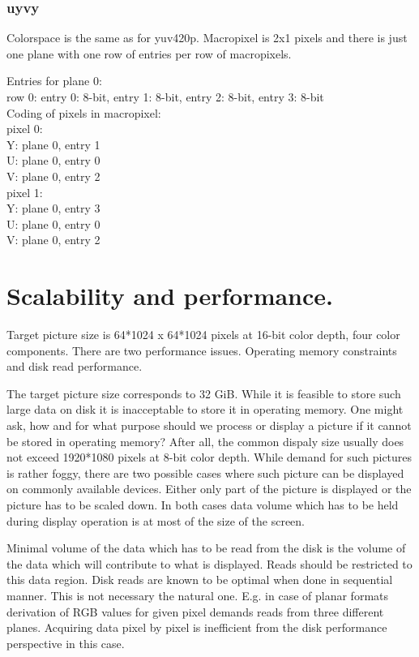 \subsubsection{uyvy}

Colorspace is the same as for yuv420p. Macropixel is 2x1 pixels and there is just one plane with one row of entries per row of macropixels. 

Entries for plane 0: \\
row 0: entry 0: 8-bit, entry 1: 8-bit, entry 2: 8-bit, entry 3: 8-bit \\

Coding of pixels in macropixel: \\
pixel 0: \\
Y: plane 0, entry 1 \\
U: plane 0, entry 0 \\
V: plane 0, entry 2 \\
pixel 1: \\
Y: plane 0, entry 3 \\
U: plane 0, entry 0 \\
V: plane 0, entry 2 \\

\section{Scalability and performance.}

Target picture size is 64*1024 x 64*1024 pixels at 16-bit color depth, four color components. There are two performance issues. Operating memory constraints and disk read performance.

The target picture size corresponds to 32 GiB. While it is feasible to store such large data on disk it is inacceptable to store it in operating memory. One might ask, how and for what purpose should we process or display a picture if it cannot be stored in operating memory? After all, the common dispaly size usually does not exceed 1920*1080 pixels at 8-bit color depth. While demand for such pictures is rather foggy, there are two possible cases where such picture can be displayed on commonly available devices. Either only part of the picture is displayed or the picture has to be scaled down. In both cases data volume which has to be held during display operation is at most of the size of the screen.

Minimal volume of the data which has to be read from the disk is the volume of the data which will  contribute to what is displayed. Reads should be restricted to this data region. Disk reads are known to be optimal when done in sequential manner. This is not necessary the natural one. E.g. in case of planar formats derivation of RGB values for given pixel demands reads from three different planes. Acquiring data pixel by pixel is inefficient from the disk performance perspective in this case.

